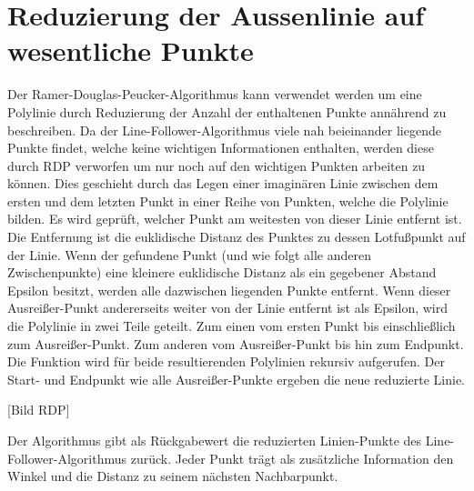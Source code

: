 %

\chapter{Reduzierung der Aussenlinie auf wesentliche Punkte}
\label{cha:Reduzierung der Aussenlinie auf wesentliche Punkte} 
%
%
Der Ramer-Douglas-Peucker-Algorithmus kann verwendet werden um eine Polylinie durch Reduzierung der Anzahl der enthaltenen Punkte ann{\"a}hrend zu beschreiben.
Da der Line-Follower-Algorithmus viele nah beieinander liegende Punkte findet, welche keine wichtigen Informationen enthalten, werden diese durch RDP verworfen um nur noch auf den wichtigen Punkten arbeiten zu k{\"o}nnen.
Dies geschieht durch das Legen einer imagin{\"a}ren Linie zwischen dem ersten und dem letzten Punkt in einer Reihe von Punkten, welche die Polylinie bilden. Es wird gepr{\"u}ft, welcher Punkt am weitesten von dieser Linie entfernt ist. Die Entfernung ist die euklidische Distanz des Punktes zu dessen Lotfu{\ss}punkt auf der Linie. Wenn der gefundene Punkt (und wie folgt alle anderen Zwischenpunkte) eine kleinere euklidische Distanz als ein gegebener Abstand Epsilon besitzt, werden alle dazwischen liegenden Punkte entfernt. Wenn dieser Ausrei{\ss}er-Punkt andererseits weiter von der Linie entfernt ist als Epsilon, wird die Polylinie in zwei Teile geteilt. Zum einen vom ersten Punkt bis einschlie{\ss}lich zum Ausrei{\ss}er-Punkt. Zum anderen vom Ausrei{\ss}er-Punkt bis hin zum Endpunkt.
Die Funktion wird f{\"u}r beide resultierenden Polylinien rekursiv aufgerufen.
Der Start- und Endpunkt wie alle Ausrei{\ss}er-Punkte ergeben die neue reduzierte Linie.

[Bild RDP]


Der Algorithmus gibt als R{\"u}ckgabewert die reduzierten Linien-Punkte des Line-Follower-Algorithmus zur{\"u}ck. Jeder Punkt tr{\"a}gt als zus{\"a}tzliche Information den Winkel und die Distanz zu seinem n{\"a}chsten Nachbarpunkt.











